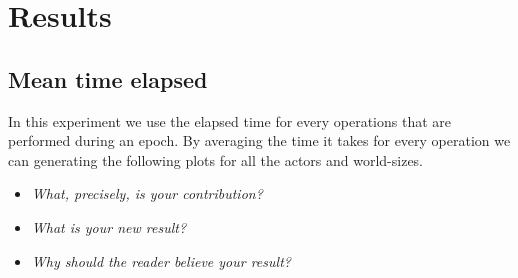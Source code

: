 \chapter{Results}
\section{Mean time elapsed}
In this experiment we use the elapsed time for every operations that are performed during an epoch. By averaging the time it takes for every operation we can generating the following plots for all the actors and world-sizes.

\begin{itemize}
    \item \textit{What, precisely, is your contribution?}
    \item \textit{What is your new result?}
    \item \textit{Why should the reader believe your result?}
\end{itemize}